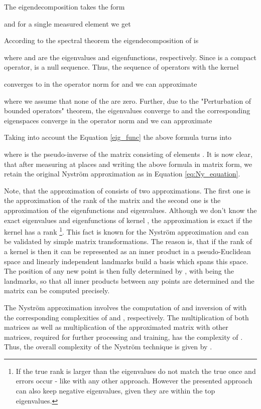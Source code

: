 \documentclass[twoside,11pt]{article}
\begin{document}
The eigendecomposition takes the form

and for a single measured element we get


\noindent According to the spectral theorem \cite{werner}
the eigendecomposition of  is

where  and  are the eigenvalues and eigenfunctions, respectively.
Since  is a compact operator,  is a null sequence.
Thus, the sequence of operators  with the kernel

converges to  in the operator norm for  \cite{werner}
and we can approximate

where we assume that none of the  are zero.
Further, due to the "Perturbation of bounded operators" theorem,
the eigenvalues  converge to 
and the corresponding eigenspaces converge in the operator norm
and we can approximate

Taking into account the Equation \eqref{eig_func} the above formula turns into

where  is the pseudo-inverse of the matrix consisting of elements .
It is now clear, that after measuring  at  places
and writing the above formula in matrix form,
we retain the original Nystr\"om approximation as in Equation \eqref{eq:Ny_equation}.

Note, that the approximation of  consists of two approximations.
The first one is the approximation of the rank of the matrix and the second one
is the approximation of the eigenfunctions and eigenvalues.
Although we don't know the exact eigenvalues and eigenfunctions
of kernel , the approximation is exact if the kernel has a rank 
\footnote{If the true rank is larger than  the eigenvalues do not match the 
true once and errors occur - like with any other approach. However the presented
approach can also keep negative eigenvalues, given they are within the top  eigenvalues.}.
This fact is known for the Nystr\"om approximation and can be validated
by simple matrix transformations. The reason is, that if the rank of a kernel is 
then it can be represented as an inner product in a pseudo-Euclidean space
and  linearly independent landmarks build a basis which spans this space.
The position of any new point  is then fully determined by ,
with  being the landmarks, so that all inner products between any points
are determined and the matrix  can be computed precisely.

The Nystr\"om approximation involves the computation of 
and inversion of  with the corresponding complexities of
 and , respectively.
The multiplication of both matrices as well as multiplication
of the approximated matrix with other matrices,
required for further processing and training,
has the complexity of .
Thus, the overall complexity of the Nystr\"om technique
is given by .
\end{document}
